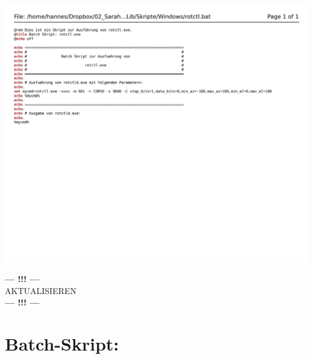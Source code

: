 \begin{center}
	\includegraphics[width=1\textwidth]{./appendicies/rotctl}
\end{center}

\begin{center}
	\Large{\textbf{--- !!! ---}\\AKTUALISIEREN\\\textbf{--- !!! ---}}
\end{center}


\chapter{Batch-Skript: }
\label{chap:rigctlddummybat}

